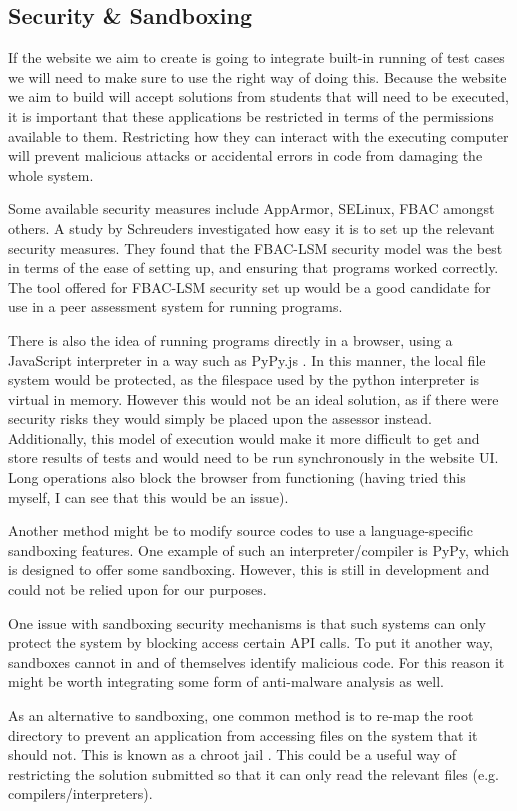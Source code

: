 \documentclass[a4paper,11pt]{report}
\begin{document}
\subsection{Security \& Sandboxing}
If the website we aim to create is going to integrate built-in running of test cases we will need to make sure to use the right way of doing this. Because the website we aim to build will accept solutions from students that will need to be executed, it is important that these applications be restricted in terms of the permissions available to them. Restricting how they can interact with the executing computer will prevent malicious attacks or accidental errors in code from damaging the whole system.\par
Some available security measures include AppArmor, SELinux, FBAC amongst others. A study by Schreuders \cite{schreuders_empowering_2011} investigated how easy it is to set up the relevant security measures. They found that the FBAC-LSM security model was the best in terms of the ease of setting up, and ensuring that programs worked correctly. The tool offered for FBAC-LSM security set up would be a good candidate for use in a peer assessment system for running programs.\par
There is also the idea of running programs directly in a browser, using a JavaScript interpreter in a way such as PyPy.js \cite{pypy.js_web_2016}. In this manner, the local file system would be protected, as the filespace used by the python interpreter is virtual in memory. However this would not be an ideal solution, as if there were security risks they would simply be placed upon the assessor instead. Additionally, this model of execution would make it more difficult to get and store results of tests and would need to be run synchronously in the website UI. Long operations also block the browser from functioning (having tried this myself, I can see that this would be an issue).\par
Another method might be to modify source codes to use a language-specific sandboxing features. One example of such an interpreter/compiler is PyPy\cite{pypy_pypy_2016}, which is designed to offer some sandboxing. However, this is still in development and could not be relied upon for our purposes.\par
One issue with sandboxing security mechanisms is that such systems can only protect the system by blocking access certain API calls. To put it another way, sandboxes cannot in and of themselves identify malicious code. For this reason it might be worth integrating some form of anti-malware analysis as well.\par
As an alternative to sandboxing, one common method is to re-map the root directory to prevent an application from accessing files on the system that it should not. This is known as a chroot jail \cite{ubuntu_basic_2016}. This could be a useful way of restricting the solution submitted so that it can only read the relevant files (e.g. compilers/interpreters).
\end{document}
